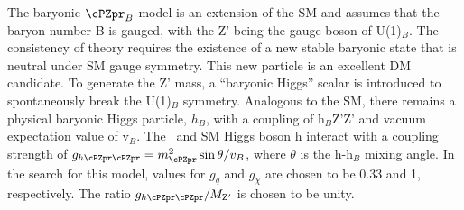 The baryonic $\cPZpr_{B}$ model is an extension of the SM and 
assumes that the baryon number B is gauged, with the Z' being the gauge 
boson of U(1)$_{B}$. The consistency of theory requires the existence of a new 
stable baryonic state that is neutral under SM gauge symmetry. This new 
particle is an excellent DM candidate. 
To generate the Z' mass, a ``baryonic Higgs'' scalar is introduced to 
spontaneously break the U(1)$_B$ symmetry. Analogous to the SM, there remains 
a physical baryonic Higgs particle, $h_{B}$, with a coupling of h$_{B}$Z'Z' 
and vacuum expectation value of v$_{B}$. 
The \cPZpr\ and SM Higgs boson h interact with a coupling strength of 
$g_{h\cPZpr\cPZpr} = m_{\cPZpr}^{2} \sin \theta/v_{B}$, where $\theta$ is the h-h$_{B}$ 
mixing angle. 
In the search for this model, values for $g_q$ and $g_\chi$ are chosen to be 0.33 and 1, respectively. The ratio $g_{h\cPZpr\cPZpr}/M_{\mathrm{Z}'}$ is chosen to be unity. 






